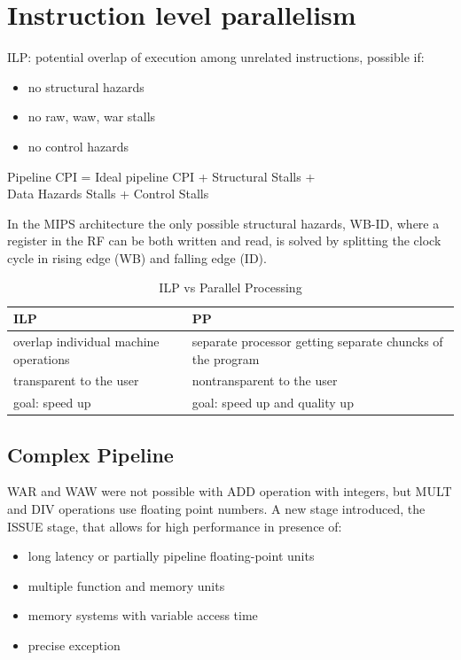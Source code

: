 
\section{Instruction level parallelism}\label{sec:instruction-level-parallelism}
ILP: potential overlap of execution among unrelated instructions, possible if:
\begin{itemize}
    \item no structural hazards
    \item no raw, waw, war stalls
    \item no control hazards
\end{itemize}

\begin{center}
    Pipeline CPI = Ideal pipeline CPI + Structural Stalls +\\Data Hazards Stalls + Control Stalls
\end{center}

In the MIPS architecture the only possible structural hazards, WB-ID, where a register in the RF can be both written
and read, is solved by splitting the clock cycle in rising edge (WB) and falling edge (ID).


\begin{table}[h]
    \centering
    \begin{tabular}{|p{6cm}|p{6cm}|}
        \toprule
        \textbf{ILP} & \textbf{PP} \\
        \midrule
        overlap individual machine operations & separate processor getting separate chuncks of the program \\
        \midrule
        transparent to the user & nontransparent to the user \\
        \midrule
        goal: speed up & goal: speed up and quality up \\
        \bottomrule
    \end{tabular}
    \caption{ILP vs Parallel Processing}
    \label{tab:ILP-vs-PP}
\end{table}


\subsection{Complex Pipeline}\label{subsec:complex-pipeline}
WAR and WAW were not possible with ADD operation with integers, but MULT and DIV operations use floating point numbers.
A new stage introduced, the ISSUE stage, that allows for high performance in presence of:
\begin{itemize}
    \item long latency or partially pipeline floating-point units
    \item multiple function and memory units
    \item memory systems with variable access time
    \item precise exception
\end{itemize}

